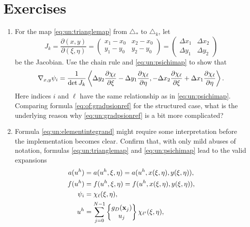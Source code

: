 \section{Exercises}

\renewcommand{\labelenumi}{\arabic{chapter}.\arabic{enumi}\quad}
\renewcommand{\labelenumii}{(\alph{enumii})}
\begin{enumerate}
\item  \label{exer:un:gradientdetails}  For the map \eqref{eq:un:trianglemap} from $\triangle_\ast$ to $\triangle_k$, let
    $$J_k = \frac{\partial (x,y)}{\partial (\xi,\eta)} = \begin{pmatrix}
    x_1 - x_0 & x_2 - x_0 \\
    y_1 - y_0 & y_2 - y_0 \end{pmatrix}
    = \begin{pmatrix}
    \Delta x_1 & \Delta x_2 \\
    \Delta y_1 & \Delta y_2
    \end{pmatrix}$$
be the Jacobian.  Use the chain rule and \eqref{eq:un:psichimap} to show that
\begin{equation}
\nabla_{x,y} \psi_i = \frac{1}{\det J_k} \left<\Delta y_2 \frac{\partial \chi_\ell}{\partial \xi} - \Delta y_1 \frac{\partial \chi_\ell}{\partial \eta}, - \Delta x_2 \frac{\partial \chi_\ell}{\partial \xi} + \Delta x_1 \frac{\partial \chi_\ell}{\partial \eta}\right>. \label{eq:un:gradpsionref}
\end{equation}
Here indices $i$ and $\ell$ have the same relationship as in \eqref{eq:un:psichimap}.  Comparing formula \eqref{eq:of:gradpsionref} for the structured case, what is the underlying reason why \eqref{eq:un:gradpsionref} is a bit more complicated?  %
\item  \label{exer:un:elementintegranddetails}  Formula \eqref{eq:un:elementintegrand} might require some interpretation before the implementation becomes clear.  Confirm that, with only mild abuses of notation, formulas \eqref{eq:un:trianglemap} and \eqref{eq:un:psichimap} lead to the valid expansions
\begin{align*}
a(u^h) &= a(u^h,\xi,\eta) = a(u^h,x(\xi,\eta),y(\xi,\eta)), \\
f(u^h) &= f(u^h,\xi,\eta) = f(u^h,x(\xi,\eta),y(\xi,\eta)), \\
\psi_i &= \chi_{\ell}(\xi,\eta), \\
u^h &= \sum_{j=0}^{N-1} \left\{\begin{matrix} g_D(\bx_j) \\ u_j \end{matrix}\right\} \chi_{\ell'}(\xi,\eta), \\

\end{align*}
\end{enumerate}
